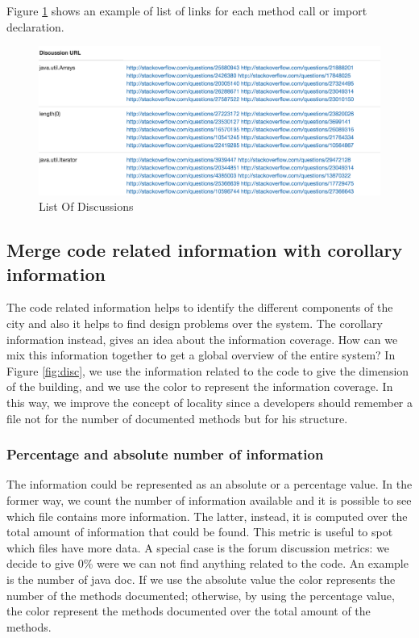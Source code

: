 \documentclass[]{usiinfbachelorproject}
\begin{document}
Figure \ref{fig:list} shows an example of list of links for each method call or import declaration.


 \begin{figure}[H]
	\centering
	\includegraphics[width=1\textwidth]{images/listOfDiscussions}
	\caption[List Of Discussions]{List Of Discussions \label{fig:list}}
 \end{figure}


\subsection{Merge code related information with corollary information}
The code related information helps to identify the different components of the city and also it helps to find design problems over the system. The corollary information instead, gives an idea about the information coverage. How can we mix this information together to get a global overview of the entire system? In Figure \ref{fig:disc}, we use the information related to the code to give the dimension of the building, and we use the color to represent the information coverage. In this way, we improve the concept of locality since a developers should remember a file not for the number of documented methods but for his structure.

\subsubsection{Percentage and absolute number of information}

The information could be represented  as an absolute or a percentage value. In the former way, we count the number of information available and it is possible to see which file contains more information. The latter, instead, it is computed over the total amount of information that could be found. This metric is useful to spot which files have more data. A special case is the forum discussion metrics: we decide to give 0\%  were we can not find anything related to the code.
An example is the number of java doc. If we use the absolute value the color represents the number of the methods documented; otherwise, by using the percentage value, the color represent the methods documented over the total amount of the methods.
\end{document}
